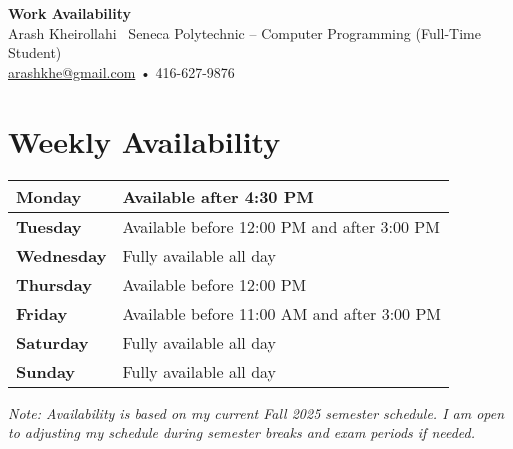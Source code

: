 \documentclass[letterpaper,11pt]{article}
\begin{document}
\begin{center}
    {\LARGE \textbf{Work Availability}} \\[0.5em]
    Arash Kheirollahi \
    Seneca Polytechnic – Computer Programming (Full-Time Student) \\
    \href{mailto:arashkhe@gmail.com}{arashkhe@gmail.com} • 416-627-9876
\end{center}

\vspace{1em}

\section*{Weekly Availability}

\begin{tabular}{|>{\raggedright}p{1.5in}|p{4in}|}
\hline
\textbf{Monday} & Available after 4:30 PM \\
\hline
\textbf{Tuesday} & Available before 12:00 PM and after 3:00 PM \\
\hline
\textbf{Wednesday} & Fully available all day \\
\hline
\textbf{Thursday} & Available before 12:00 PM \\
\hline
\textbf{Friday} & Available before 11:00 AM and after 3:00 PM \\
\hline
\textbf{Saturday} & Fully available all day \\
\hline
\textbf{Sunday} & Fully available all day \\
\hline
\end{tabular}

\vspace{1.5em}

\textit{Note: Availability is based on my current Fall 2025 semester schedule. I am open to adjusting my schedule during semester breaks and exam periods if needed.}
\end{document}
